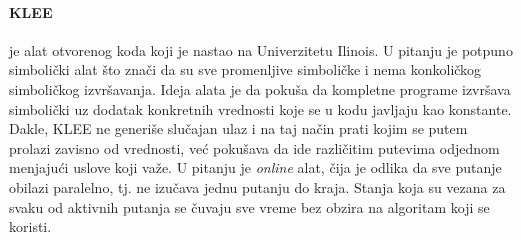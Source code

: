 \documentclass[12pt,oneside]{memoir}
\begin{document}
\paragraph{KLEE}\cite{klee} je alat otvorenog koda koji je nastao na Univerzitetu Ilinois. U pitanju je potpuno simbolički alat što znači da su sve promenljive simboličke i nema konkoličkog simboličkog izvršavanja. Ideja alata je da pokuša da kompletne programe izvršava simbolički uz dodatak konkretnih vrednosti koje se u kodu javljaju kao konstante. Dakle, KLEE ne generiše slučajan ulaz i na taj način prati kojim se putem prolazi zavisno od vrednosti, već pokušava da ide različitim putevima odjednom menjajući uslove koji važe. U pitanju je \textit{online} alat, čija je odlika da sve putanje obilazi paralelno, tj. ne izučava jednu putanju do kraja. Stanja koja su vezana za svaku od aktivnih putanja se čuvaju sve vreme bez obzira na algoritam koji se koristi.
\end{document}
